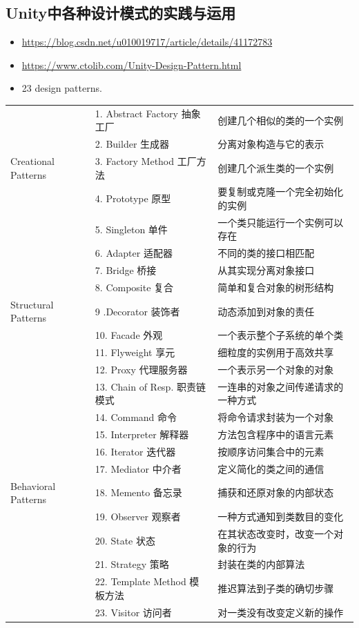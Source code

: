 \documentclass[9pt, b5paper]{article}
\begin{document}
\subsection{Unity中各种设计模式的实践与运用}
\label{sec:org7a5649a}
\begin{itemize}
\item \url{https://blog.csdn.net/u010019717/article/details/41172783}
\item \url{https://www.ctolib.com/Unity-Design-Pattern.html}
\item 23 design patterns.
\end{itemize}
\begin{center}
\begin{tabular}{lll}
\hline
 & 1. Abstract Factory 抽象工厂 & 创建几个相似的类的一个实例\\
 & 2. Builder 生成器 & 分离对象构造与它的表示\\
Creational Patterns & 3. Factory Method 工厂方法 & 创建几个派生类的一个实例\\
 & 4. Prototype 原型 & 要复制或克隆一个完全初始化的实例\\
 & 5. Singleton 单件 & 一个类只能运行一个实例可以存在\\
\hline
 & 6. Adapter 适配器 & 不同的类的接口相匹配\\
 & 7. Bridge 桥接 & 从其实现分离对象接口\\
 & 8. Composite 复合 & 简单和复合对象的树形结构\\
Structural Patterns & 9 .Decorator 装饰者 & 动态添加到对象的责任\\
 & 10. Facade 外观 & 一个表示整个子系统的单个类\\
 & 11. Flyweight 享元 & 细粒度的实例用于高效共享\\
 & 12. Proxy 代理服务器 & 一个表示另一个对象的对象\\
\hline
 & 13. Chain of Resp. 职责链模式 & 一连串的对象之间传递请求的一种方式\\
 & 14. Command 命令 & 将命令请求封装为一个对象\\
 & 15. Interpreter 解释器 & 方法包含程序中的语言元素\\
 & 16. Iterator 迭代器 & 按顺序访问集合中的元素\\
 & 17. Mediator 中介者 & 定义简化的类之间的通信\\
Behavioral Patterns & 18. Memento 备忘录 & 捕获和还原对象的内部状态\\
 & 19. Observer 观察者 & 一种方式通知到类数目的变化\\
 & 20. State 状态 & 在其状态改变时，改变一个对象的行为\\
 & 21. Strategy 策略 & 封装在类的内部算法\\
 & 22. Template Method 模板方法 & 推迟算法到子类的确切步骤\\
 & 23. Visitor 访问者 & 对一类没有改变定义新的操作\\
\hline
\end{tabular}
\end{center}
\end{document}
